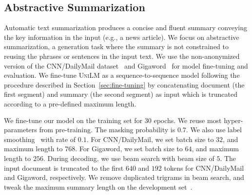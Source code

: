 \documentclass{article}
\newcommand\ours{\textsc{UniLM}}
\begin{document}
\subsection{Abstractive Summarization}

Automatic text summarization produces a concise and fluent summary conveying the key information in the input (e.g., a news article).
We focus on abstractive summarization, a generation task where the summary is not constrained to reusing the phrases or sentences in the input text.
We use the non-anonymized version of the CNN/DailyMail dataset~\cite{see-etal-2017-get} and Gigaword~\cite{abs} for model fine-tuning and evaluation.
%
We fine-tune \ours{} as a sequence-to-sequence model following the procedure described in Section~\ref{sec:fine-tuning} by 
concatenating document (the first segment) and summary (the second segment) as input which is truncated according to a pre-defined maximum length. 

We fine-tune our model on the training set for $30$ epochs.
We reuse most hyper-parameters from pre-training. The masking probability is $0.7$. We also use label smoothing~\cite{label:smoothing} with rate of $0.1$.
For CNN/DailyMail, we set batch size to $32$, and maximum length to $768$.
For Gigaword, we set batch size to $64$, and maximum length to $256$.
During decoding, we use beam search with beam size of $5$. The input document is truncated to the first $640$ and $192$ tokens for CNN/DailyMail and Gigaword, respectively.
We remove duplicated trigrams in beam search, and tweak the maximum summary length on the development set~\cite{Paulus2018ADR, Edunov2019PretrainedLM}.
\end{document}
